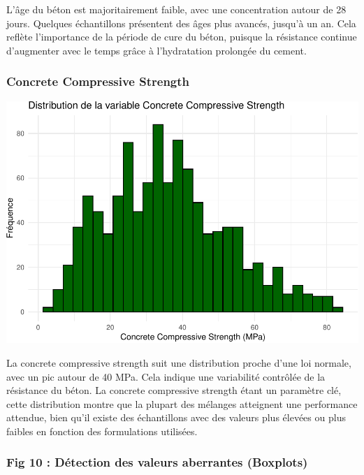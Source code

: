 \documentclass[
  12pt,
]{article}
\begin{document}
L'âge du béton est majoritairement faible, avec une concentration autour
de 28 jours. Quelques échantillons présentent des âges plus avancés,
jusqu'à un an. Cela reflète l'importance de la période de cure du béton,
puisque la résistance continue d'augmenter avec le temps grâce à
l'hydratation prolongée du cement.

\subsubsection{Concrete Compressive
Strength}\label{concrete-compressive-strength}

\includegraphics{rmd_final_files/figure-latex/unnamed-chunk-9-1.pdf}

La concrete compressive strength suit une distribution proche d'une loi
normale, avec un pic autour de 40 MPa. Cela indique une variabilité
contrôlée de la résistance du béton. La concrete compressive strength
étant un paramètre clé, cette distribution montre que la plupart des
mélanges atteignent une performance attendue, bien qu'il existe des
échantillons avec des valeurs plus élevées ou plus faibles en fonction
des formulations utilisées.

\subsubsection{Fig 10 : Détection des valeurs aberrantes
(Boxplots)}\label{fig-10-duxe9tection-des-valeurs-aberrantes-boxplots}
\end{document}
